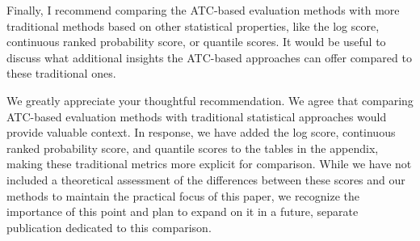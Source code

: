 \documentclass[12pt]{journalrebuttal}
\begin{document}
\begin{revcomment}
    Finally, I recommend comparing the ATC-based evaluation methods with more traditional methods based on other statistical properties, like the log score, continuous ranked probability score, or quantile scores. It would be useful to discuss what additional insights the ATC-based approaches can offer compared to these traditional ones.
\end{revcomment}
\begin{response}
    We greatly appreciate your thoughtful recommendation. We agree that comparing ATC-based evaluation methods with traditional statistical approaches would provide valuable context. In response, we have added the log score, continuous ranked probability score, and quantile scores to the tables in the appendix, making these traditional metrics more explicit for comparison. While we have not included a theoretical assessment of the differences between these scores and our methods to maintain the practical focus of this paper, we recognize the importance of this point and plan to expand on it in a future, separate publication dedicated to this comparison.
\end{response}
\end{document}
